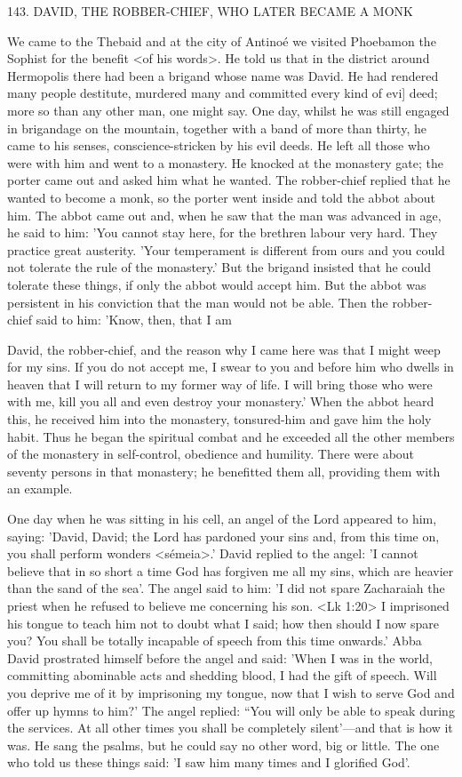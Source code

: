 143.
DAVID, THE ROBBER-CHIEF, WHO LATER
BECAME A MONK

We came to the Thebaid and at the city of Antinoé we visited
Phoebamon the Sophist for the benefit <of his words>.
He told us
that in the district around Hermopolis there had been a brigand
whose name was David.
He had rendered many people destitute,
murdered many and committed every kind of evi] deed; more so
than any other man, one might say.
One day, whilst he was still
engaged in brigandage on the mountain, together with a band of
more than thirty, he came to his senses, conscience-stricken by his
evil deeds.
He left all those who were with him and went to a
monastery.
He knocked at the monastery gate; the porter came out
and asked him what he wanted.
The robber-chief replied that he
wanted to become a monk, so the porter went inside and told the
abbot about him.
The abbot came out and, when he saw that the
man was advanced in age, he said to him: 'You cannot stay here,
for the brethren labour very hard.
They practice great austerity.
'Your temperament is different from ours and you could not tolerate
the rule of the monastery.' But the brigand insisted that he could
tolerate these things, if only the abbot would accept him.
But the
abbot was persistent in his conviction that the man would not be
able.
Then the robber-chief said to him: 'Know, then, that I am

David, the robber-chief, and the reason why I came here was that
I might weep for my sins.
If you do not accept me, I swear to you
and before him who dwells in heaven that I will return to my
former way of life.
I will bring those who were with me, kill you all
and even destroy your monastery.' When the abbot heard this, he
received him into the monastery, tonsured-him and gave him the
holy habit.
Thus he began the spiritual combat and he exceeded all
the other members of the monastery in self-control, obedience and
humility.
There were about seventy persons in that monastery; he
benefitted them all, providing them with an example.

One day when he was sitting in his cell, an angel of the Lord
appeared to him, saying: 'David, David; the Lord has pardoned
your sins and, from this time on, you shall perform wonders
<sémeia>.' David replied to the angel: 'I cannot believe that in so
short a time God has forgiven me all my sins, which are heavier
than the sand of the sea'.
The angel said to him: 'I did not spare
Zacharaiah the priest when he refused to believe me concerning his
son.
<Lk 1:20> I imprisoned his tongue to teach him not to doubt
what I said; how then should I now spare you? You shall be totally
incapable of speech from this time onwards.' Abba David prostrated
himself before the angel and said: 'When I was in the world,
committing abominable acts and shedding blood, I had the gift of
speech.
Will you deprive me of it by imprisoning my tongue, now
that I wish to serve God and offer up hymns to him?' The angel
replied: “You will only be able to speak during the services.
At all
other times you shall be completely silent'—and that is how it was.
He sang the psalms, but he could say no other word, big or little.
The one who told us these things said: 'I saw him many times and
I glorified God'.

